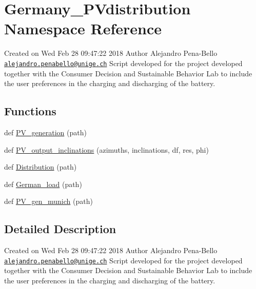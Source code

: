 \hypertarget{namespace_germany___p_vdistribution}{}\section{Germany\+\_\+\+P\+Vdistribution Namespace Reference}
\label{namespace_germany___p_vdistribution}


Created on Wed Feb 28 09\+:47\+:22 2018 Author Alejandro Pena-\/\+Bello \href{mailto:alejandro.penabello@unige.ch}{\tt alejandro.\+penabello@unige.\+ch} Script developed for the project developed together with the Consumer Decision and Sustainable Behavior Lab to include the user preferences in the charging and discharging of the battery.  


\subsection*{Functions}
\begin{DoxyCompactItemize}
\item 
def \mbox{\hyperlink{namespace_germany___p_vdistribution_ac323d1a8294f56cfe777f1e54a973b8a}{P\+V\+\_\+generation}} (path)
\item 
def \mbox{\hyperlink{namespace_germany___p_vdistribution_acc1f617f814d8015bf82d012c33f448a}{P\+V\+\_\+output\+\_\+inclinations}} (azimuths, inclinations, df, res, phi)
\item 
def \mbox{\hyperlink{namespace_germany___p_vdistribution_a77ad969c1805a36ffa94e1a13d74e4a8}{Distribution}} (path)
\item 
def \mbox{\hyperlink{namespace_germany___p_vdistribution_aaa5507696663fbe8f180bbdb34260a25}{German\+\_\+load}} (path)
\item 
def \mbox{\hyperlink{namespace_germany___p_vdistribution_ad3081c58ad3af6f4cec1676bd4b5f585}{P\+V\+\_\+gen\+\_\+munich}} (path)
\end{DoxyCompactItemize}


\subsection{Detailed Description}
Created on Wed Feb 28 09\+:47\+:22 2018 Author Alejandro Pena-\/\+Bello \href{mailto:alejandro.penabello@unige.ch}{\tt alejandro.\+penabello@unige.\+ch} Script developed for the project developed together with the Consumer Decision and Sustainable Behavior Lab to include the user preferences in the charging and discharging of the battery. 

